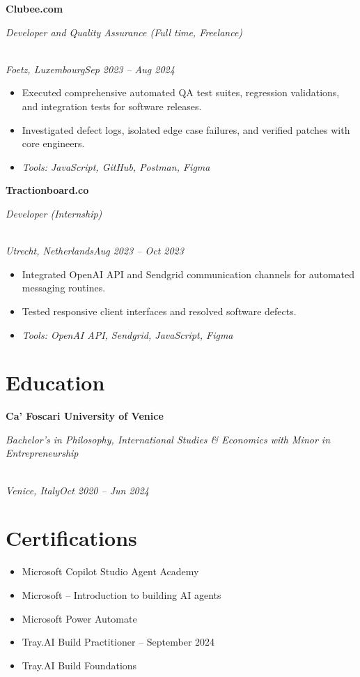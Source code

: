 \documentclass[a4paper,10pt]{article}
\newcommand{\role}[4]{\vspace{3pt}\noindent\hspace{0.6em}\parbox[t]{0.38\textwidth}{\raggedright\textbf{#1}}\hfill\parbox[t]{0.58\textwidth}{\raggedleft\textit{#2}}\\{\textit{#3}\hfill\textit{#4}}\vspace{1pt}}
\begin{document}
\role{Clubee.com}{Developer and Quality Assurance (Full time, Freelance)}{Foetz, Luxembourg}{Sep 2023 -- Aug 2024}
\begin{itemize}
\item Executed comprehensive automated QA test suites, regression validations, and integration tests for software releases.
\item Investigated defect logs, isolated edge case failures, and verified patches with core engineers.
\item \textit{Tools: JavaScript, GitHub, Postman, Figma}
\end{itemize}

\role{Tractionboard.co}{Developer (Internship)}{Utrecht, Netherlands}{Aug 2023 -- Oct 2023}
\begin{itemize}
\item Integrated OpenAI API and Sendgrid communication channels for automated messaging routines.
\item Tested responsive client interfaces and resolved software defects.
\item \textit{Tools: OpenAI API, Sendgrid, JavaScript, Figma}
\end{itemize}

\section{Education}
\role{Ca' Foscari University of Venice}{Bachelor's in Philosophy, International Studies \& Economics with Minor in Entrepreneurship}{Venice, Italy}{Oct 2020 -- Jun 2024}

\section{Certifications}
\begin{itemize}
\item Microsoft Copilot Studio Agent Academy
\item Microsoft -- Introduction to building AI agents
\item Microsoft Power Automate
\item Tray.AI Build Practitioner -- September 2024
\item Tray.AI Build Foundations
\end{itemize}
\end{document}
